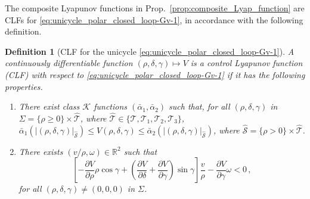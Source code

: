 \documentclass[journal,twoside,web]{ieeecolor}
\newtheorem{definition}{Definition}
\theoremstyle{definition}
\begin{document}
The composite Lyapunov functions in Prop.~\ref{prop:composite_Lyap_function} are CLFs for \eqref{eq:unicycle_polar_closed_loop-Gv-1}, in accordance with the following definition. 
\begin{definition}[CLF for the unicycle \eqref{eq:unicycle_polar_closed_loop-Gv-1}]
\label{def-CLF}
A continuously differentiable function $(\rho,\delta,\gamma)\mapsto V$ 
is a \textit{control Lyapunov function} (CLF) with respect to \eqref{eq:unicycle_polar_closed_loop-Gv-1} if it has the following properties.
\begin{enumerate}
\item There exist class $\mathcal{K}$ functions  $(\bar\alpha_1,\bar\alpha_2)$ such that,  for all $(\rho,\delta,\gamma)$ in 
$\Sigma = \{\rho\geq 0\}\times \hat{\mathcal{T}}$, where $\hat{\mathcal{T}}\in\{\mathcal{T},\mathcal{T}_1, \mathcal{T}_2, \mathcal{T}_3\}$, 
$ \bar\alpha_1(|(\rho,\delta, \gamma)|_{\hat{\mathcal{S}}}) \le V(\rho,\delta,\gamma) \le \bar\alpha_2(|(\rho,\delta, \gamma)|_{\hat{\mathcal{S}}})$, where $\hat{\mathcal{S}} = \{\rho> 0\}\times \hat{\mathcal{T}}$. \label{it:clf_prop_1}
\item There exists $(v/\rho,\omega)\in \mathbb{R}^2$ such that
\begin{equation*}
\left[-\dfrac{\partial V}{\partial\rho}\rho\cos\gamma + \left(\dfrac{\partial V}{\partial\delta}+\dfrac{\partial V}{\partial\gamma}\right)\sin\gamma \right]\dfrac{v}{\rho} - \dfrac{\partial V}{\partial\gamma}\omega < 0 \,,
\end{equation*}
for all $(\rho,\delta,\gamma)\neq (0,0,0)$ in $\Sigma$. \label{it:clf_prop_2}
\end{enumerate}
\end{definition}

\end{document}
